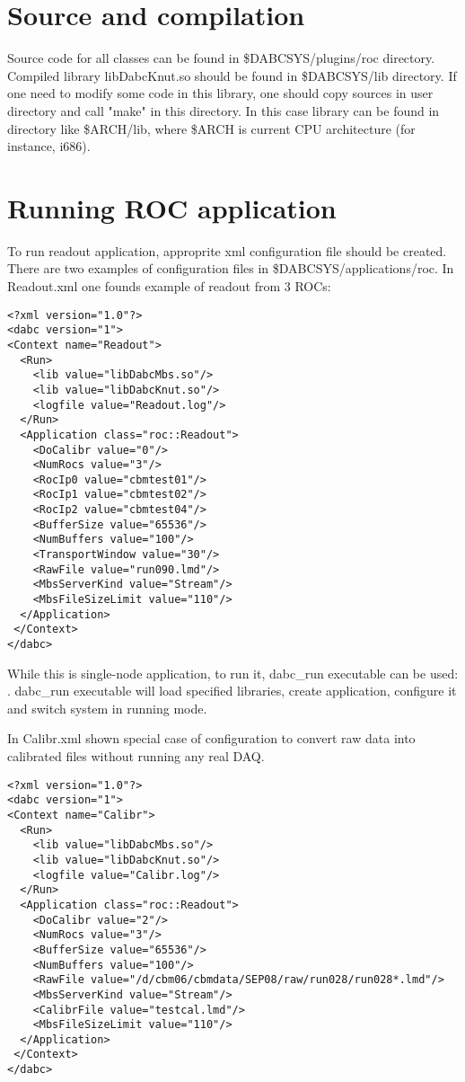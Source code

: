 \section{Source and compilation}

Source code for all classes can be found in \$DABCSYS/plugins/roc directory. 
Compiled library libDabcKnut.so should be found in \$DABCSYS/lib directory.
If one need to modify some code in this library, one should copy sources in 
user directory and call "make" in this directory. In this case library can be found
in directory like \$ARCH/lib, where \$ARCH is current CPU architecture (for instance, i686).

 
\section{Running ROC application}

To run readout application, approprite xml configuration file should be created.
There are two examples of configuration files in \$DABCSYS/applications/roc.
In Readout.xml one founds example of readout from 3 ROCs: 

\begin{verbatim}
<?xml version="1.0"?>
<dabc version="1">
<Context name="Readout">
  <Run>
    <lib value="libDabcMbs.so"/>
    <lib value="libDabcKnut.so"/>
    <logfile value="Readout.log"/>
  </Run>
  <Application class="roc::Readout">
    <DoCalibr value="0"/>
    <NumRocs value="3"/>
    <RocIp0 value="cbmtest01"/>
    <RocIp1 value="cbmtest02"/>
    <RocIp2 value="cbmtest04"/>
    <BufferSize value="65536"/>
    <NumBuffers value="100"/>
    <TransportWindow value="30"/>
    <RawFile value="run090.lmd"/>
    <MbsServerKind value="Stream"/>
    <MbsFileSizeLimit value="110"/>
  </Application>
 </Context>
</dabc>
\end{verbatim}

While this is single-node application, to run it, dabc\_run executable can be used:
. dabc\_run executable will load specified libraries,
create application, configure it and switch system in running mode.   

In Calibr.xml shown special case of configuration to convert raw data 
into calibrated files without running any real DAQ. 

\begin{verbatim}
<?xml version="1.0"?>
<dabc version="1">
<Context name="Calibr">
  <Run>
    <lib value="libDabcMbs.so"/>
    <lib value="libDabcKnut.so"/>
    <logfile value="Calibr.log"/>
  </Run>
  <Application class="roc::Readout">
    <DoCalibr value="2"/>
    <NumRocs value="3"/>
    <BufferSize value="65536"/>
    <NumBuffers value="100"/>
    <RawFile value="/d/cbm06/cbmdata/SEP08/raw/run028/run028*.lmd"/>
    <MbsServerKind value="Stream"/>
    <CalibrFile value="testcal.lmd"/>
    <MbsFileSizeLimit value="110"/>
  </Application>
 </Context>
</dabc>
\end{verbatim}


 